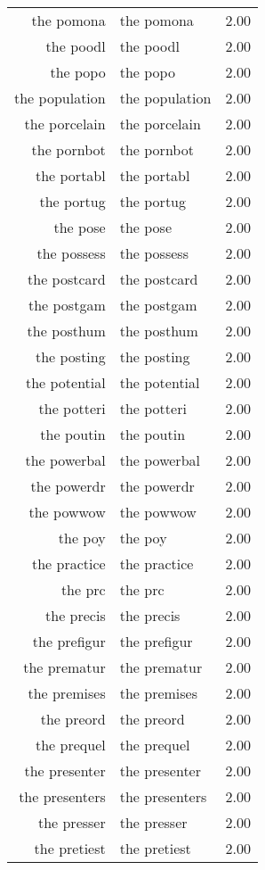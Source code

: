 \begin{table}[ht]
\begin{tabular}{rlr}
  the pomona & the pomona & 2.00 \\ 
  the poodl & the poodl & 2.00 \\ 
  the popo & the popo & 2.00 \\ 
  the population & the population & 2.00 \\ 
  the porcelain & the porcelain & 2.00 \\ 
  the pornbot & the pornbot & 2.00 \\ 
  the portabl & the portabl & 2.00 \\ 
  the portug & the portug & 2.00 \\ 
  the pose & the pose & 2.00 \\ 
  the possess & the possess & 2.00 \\ 
  the postcard & the postcard & 2.00 \\ 
  the postgam & the postgam & 2.00 \\ 
  the posthum & the posthum & 2.00 \\ 
  the posting & the posting & 2.00 \\ 
  the potential & the potential & 2.00 \\ 
  the potteri & the potteri & 2.00 \\ 
  the poutin & the poutin & 2.00 \\ 
  the powerbal & the powerbal & 2.00 \\ 
  the powerdr & the powerdr & 2.00 \\ 
  the powwow & the powwow & 2.00 \\ 
  the poy & the poy & 2.00 \\ 
  the practice & the practice & 2.00 \\ 
  the prc & the prc & 2.00 \\ 
  the precis & the precis & 2.00 \\ 
  the prefigur & the prefigur & 2.00 \\ 
  the prematur & the prematur & 2.00 \\ 
  the premises & the premises & 2.00 \\ 
  the preord & the preord & 2.00 \\ 
  the prequel & the prequel & 2.00 \\ 
  the presenter & the presenter & 2.00 \\ 
  the presenters & the presenters & 2.00 \\ 
  the presser & the presser & 2.00 \\ 
  the pretiest & the pretiest & 2.00 \\ 

\end{tabular}
\end{table}
